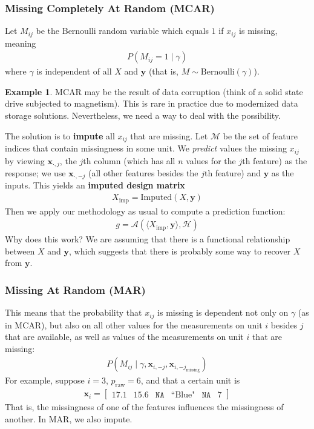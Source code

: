 \documentclass[12pt, a4paper]{article}
\theoremstyle{definition}
\newtheorem*{example}{Example}
\begin{document}
	\subsubsection{Missing Completely At Random (MCAR)}
	Let $M_{ij}$ be the Bernoulli random variable which equals $1$ if $x_{ij}$
	is missing, meaning
	\begin{align*}
		P(M_{ij} = 1 \mid \gamma)
	\end{align*}
	where $\gamma$ is independent of all $X$ and $\bm{y}$ (that is,
	$M \sim \text{Bernoulli}(\gamma)$).
	
	\begin{tcolorbox}[breakable]
		\begin{example}
			MCAR may be the result of data corruption (think of a solid
			state drive subjected to magnetism). This is rare in practice due to
			modernized data storage solutions. Nevertheless, we need a way to deal with
			the possibility.
		\end{example}
	\end{tcolorbox}
	
	The solution is to \textbf{impute} all $x_{ij}$ that are missing. Let
	$\mathcal{M}$ be the set of feature indices that contain missingness
	in some unit. We \textit{predict} values the missing $x_{ij}$ by viewing
	$\bm{x}_{\cdot, j}$, the $j$th column (which has all $n$ values for the $j$th feature)
	as the response; we use $\bm{x}_{\cdot, -j}$ (all other features besides the
	$j$th feature) and $\bm{y}$ as the inputs. This yields an \textbf{imputed design matrix}
	\begin{align*}
		X_{\text{imp}} = \text{Imputed}(X, \bm{y})
	\end{align*}
	Then we apply our methodology as usual to compute a prediction function:
	\begin{align*}
		g = \mathcal{A}(\langle X_{\text{imp}}, \bm{y} \rangle, \mathcal{H})
	\end{align*}
	Why does this work? We are assuming that there is a functional relationship
	between $X$ and $\bm{y}$, which suggests that there is probably some
	way to recover $X$ from $\bm{y}$.
	\subsubsection{Missing At Random (MAR)}
	This means that the probability that $x_{ij}$ is missing is dependent
	not only on $\gamma$ (as in MCAR), but also on all other values for
	the measurements on unit $i$ besides $j$ that are available, as well as values
	of the measurements on unit $i$ that are missing:
	\begin{align*}
		P\left(M_{ij} \mid \gamma, \bm{x}_{i, -j}, \bm{x}_{i, -j_{\text{missing}}}\right)
	\end{align*}
	For example, suppose $i = 3$, $p_{\text{raw}} = 6$, and that a certain unit is
	\begin{align*}
		\bm{x}_i = \begin{bmatrix}
			17.1 & 15.6 & \texttt{NA} & \text{``Blue"} & \texttt{NA} & 7
		\end{bmatrix}
	\end{align*}
	That is, the missingness of one of the features influences the missingness
	of another. In MAR, we also impute.
	
\end{document}
